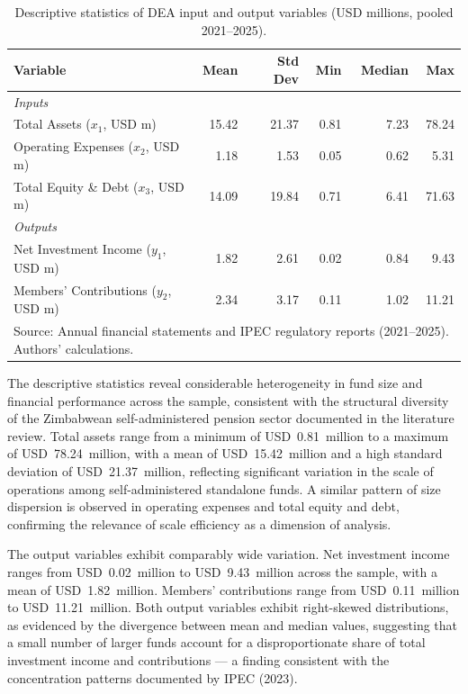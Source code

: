 \documentclass[12pt,a4paper]{article}
\begin{document}
\begin{table}[H]
\centering
\caption{Descriptive statistics of DEA input and output variables (USD millions, pooled 2021--2025).}
\label{tab:descriptive_stats}
\begin{tabular}{lrrrrr}
\toprule
\textbf{Variable} & \textbf{Mean} & \textbf{Std Dev} & \textbf{Min} & \textbf{Median} & \textbf{Max} \\
\midrule
\textit{Inputs} & & & & & \\
Total Assets ($x_1$, USD m)         & 15.42 & 21.37 &  0.81 &  7.23 & 78.24 \\
Operating Expenses ($x_2$, USD m)   &  1.18 &  1.53 &  0.05 &  0.62 &  5.31 \\
Total Equity \& Debt ($x_3$, USD m) & 14.09 & 19.84 &  0.71 &  6.41 & 71.63 \\
\midrule
\textit{Outputs} & & & & & \\
Net Investment Income ($y_1$, USD m)  & 1.82 & 2.61 & 0.02 & 0.84 &  9.43 \\
Members' Contributions ($y_2$, USD m) & 2.34 & 3.17 & 0.11 & 1.02 & 11.21 \\
\bottomrule
\multicolumn{6}{l}{\footnotesize Source: Annual financial statements and IPEC regulatory reports (2021--2025). Authors' calculations.}
\end{tabular}
\end{table}

The descriptive statistics reveal considerable heterogeneity in fund size and financial performance across the sample, consistent with the structural diversity of the Zimbabwean self-administered pension sector documented in the literature review. Total assets range from a minimum of USD~0.81~million to a maximum of USD~78.24~million, with a mean of USD~15.42~million and a high standard deviation of USD~21.37~million, reflecting significant variation in the scale of operations among self-administered standalone funds. A similar pattern of size dispersion is observed in operating expenses and total equity and debt, confirming the relevance of scale efficiency as a dimension of analysis.

The output variables exhibit comparably wide variation. Net investment income ranges from USD~0.02~million to USD~9.43~million across the sample, with a mean of USD~1.82~million. Members' contributions range from USD~0.11~million to USD~11.21~million. Both output variables exhibit right-skewed distributions, as evidenced by the divergence between mean and median values, suggesting that a small number of larger funds account for a disproportionate share of total investment income and contributions --- a finding consistent with the concentration patterns documented by IPEC (2023).
\end{document}
